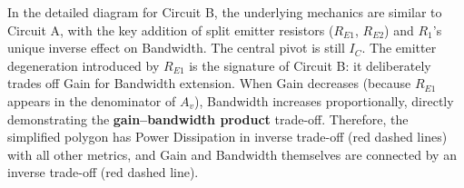 \documentclass[11pt, a4paper]{article}
\begin{document}

In the detailed diagram for Circuit B, the underlying mechanics are similar to Circuit A, with the key addition of split emitter resistors ($R_{E1}$, $R_{E2}$) and $R_1$'s unique inverse effect on Bandwidth. The central pivot is still $I_C$. The emitter degeneration introduced by $R_{E1}$ is the signature of Circuit B: it deliberately trades off Gain for Bandwidth extension. When Gain decreases (because $R_{E1}$ appears in the denominator of $A_v$), Bandwidth increases proportionally, directly demonstrating the \textbf{gain--bandwidth product} trade-off. Therefore, the simplified polygon has Power Dissipation in inverse trade-off (red dashed lines) with all other metrics, and Gain and Bandwidth themselves are connected by an inverse trade-off (red dashed line). 
\end{document}
